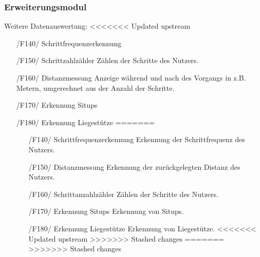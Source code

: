 \documentclass[a4paper,12pt]{article}
\begin{document}
    \subsubsection{Erweiterungsmodul}
      Weitere Datenauswertung:
<<<<<<< Updated upstream
      \begin{itemize}
      \item[/F140/] \textsf{Schrittfrequenzerkennung}%
      \item[/F150/] \textsf{Schrittzahlzähler} Zählen der Schritte des Nutzers. %
      \item[/F160/] \textsf{Distanzmessung} Anzeige während und nach des Vorgangs in z.B. Metern, umgerechnet aus der Anzahl der Schritte.
      \item[/F170/] \textsf{Erkennung Situps}
      \item[/F180/] \textsf{Erkennung Liegestütze}
=======
      \begin{itemize}
      \item[/F140/] \textsf{Schrittfrequenzerkennung} Erkennung der Schrittfrequenz des Nutzers. %
      \item[/F150/] \textsf{Distanzmessung} Erkennung der zurückgelegten Distanz des Nutzers.
      \item[/F160/] \textsf{Schrittanzahlzähler} Zählen der Schritte des Nutzers.
      \item[/F170/] \textsf{Erkennung Situps} Erkennung von Situps.
      \item[/F180/] \textsf{Erkennung Liegestütze} Erkennung von Liegestütze.
<<<<<<< Updated upstream
>>>>>>> Stashed changes
=======
>>>>>>> Stashed changes
      \end{itemize} 

\end{itemize}
\end{document}
